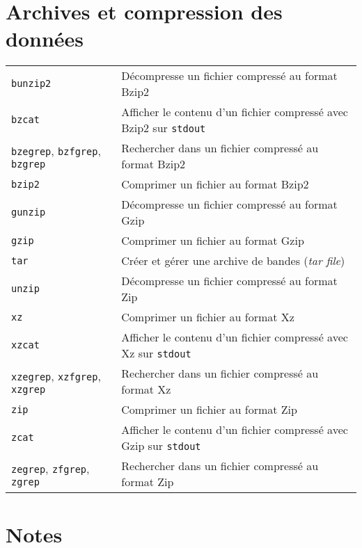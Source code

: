 \documentclass[10pt,a4paper]{article}
\begin{document}
\begin{multicols}{2}
\section{Archives et compression des données}
\begin{tabular}{ p{2.75cm} p{8.25cm} }
  \hline 
  \texttt{bunzip2} & Décompresse un fichier compressé au format Bzip2 \\
  \rowcolor{Gray}
  \texttt{bzcat} & Afficher le contenu d'un fichier compressé avec Bzip2 sur \texttt{stdout}\\
  \texttt{bzegrep}, \texttt{bzfgrep}, \texttt{bzgrep} & Rechercher dans un fichier compressé au format Bzip2 \\
  \rowcolor{Gray}
  \texttt{bzip2} & Comprimer un fichier au format Bzip2 \\
  \texttt{gunzip} & Décompresse un fichier compressé au format Gzip \\
  \rowcolor{Gray}
  \texttt{gzip} & Comprimer un fichier au format Gzip \\
  \texttt{tar} & Créer et gérer une archive de bandes (\textit{tar file}) \\
  \rowcolor{Gray}
  \texttt{unzip} & Décompresse un fichier compressé au format Zip \\
  \texttt{xz} & Comprimer un fichier au format Xz \\
  \rowcolor{Gray}
  \texttt{xzcat} & Afficher le contenu d'un fichier compressé avec Xz sur \texttt{stdout} \\
  \texttt{xzegrep}, \texttt{xzfgrep}, \texttt{xzgrep} & Rechercher dans un fichier compressé au format Xz \\
  \rowcolor{Gray}
  \texttt{zip} & Comprimer un fichier au format Zip \\
  \texttt{zcat} & Afficher le contenu d'un fichier compressé avec Gzip sur \texttt{stdout} \\
  \rowcolor{Gray}
  \texttt{zegrep}, \texttt{zfgrep}, \texttt{zgrep} & Rechercher dans un fichier compressé au format Zip \\
  \hline
\end{tabular}


\columnbreak

\section*{Notes}


\end{multicols}
\end{document}
